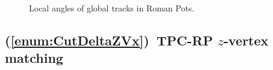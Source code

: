 \begin{figure}[ht!]
{\begin{subfigure}[b]{\linewidth}{
                }
  \end{subfigure}
}
\quad
\parbox{0.315\textwidth}{
  \centering
  \begin{subfigure}[b]{\linewidth}{
                }
  \end{subfigure}
}%
\caption{Local angles of global tracks in Roman Pots.}
\end{figure}



\subsection{(\ref{enum:CutDeltaZVx})~TPC-RP \texorpdfstring{$z$}{z}-vertex matching}



